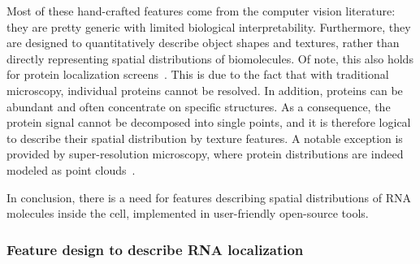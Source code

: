 Most of these hand-crafted features come from the computer vision literature: they are pretty generic with limited biological interpretability. Furthermore, they are designed to quantitatively describe object shapes and textures, rather than directly representing spatial distributions of biomolecules. Of note, this also holds for protein localization screens~\cite{Glory2007, Ouyang2019b}. This is due to the fact that with traditional microscopy, individual proteins cannot be resolved. In addition, proteins can be abundant and often concentrate on specific structures. As a consequence, the protein signal cannot be decomposed into single points, and it is therefore logical to describe their spatial distribution by texture features. A notable exception is provided by super-resolution microscopy, where protein distributions are indeed modeled as point clouds~\cite{Levet2019}. 

In conclusion, there is a need for features describing spatial distributions of RNA molecules inside the cell, implemented in user-friendly open-source tools. 




\subsubsection{Feature design to describe RNA localization}

